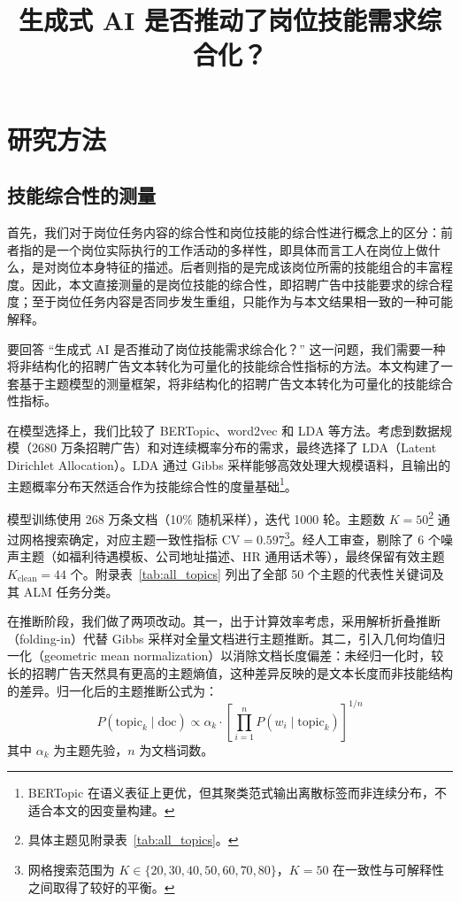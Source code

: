\documentclass[12pt, a4paper]{article}
\title{生成式 AI 是否推动了岗位技能需求综合化？}
\author{}
\date{}
\begin{document}
\maketitle

\section{研究方法}

\subsection{技能综合性的测量}

首先，我们对于岗位任务内容的综合性和岗位技能的综合性进行概念上的区分：前者指的是一个岗位实际执行的工作活动的多样性，即具体而言工人在岗位上做什么，是对岗位本身特征的描述。后者则指的是完成该岗位所需的技能组合的丰富程度。因此，本文直接测量的是岗位技能的综合性，即招聘广告中技能要求的综合程度；至于岗位任务内容是否同步发生重组，只能作为与本文结果相一致的一种可能解释。

要回答 “生成式 AI 是否推动了岗位技能需求综合化？” 这一问题，我们需要一种将非结构化的招聘广告文本转化为可量化的技能综合性指标的方法。本文构建了一套基于主题模型的测量框架，将非结构化的招聘广告文本转化为可量化的技能综合性指标。

在模型选择上，我们比较了 BERTopic、word2vec 和 LDA 等方法。考虑到数据规模（2680 万条招聘广告）和对连续概率分布的需求，最终选择了 LDA（Latent Dirichlet Allocation）。LDA 通过 Gibbs 采样能够高效处理大规模语料，且输出的主题概率分布天然适合作为技能综合性的度量基础\footnote{BERTopic 在语义表征上更优，但其聚类范式输出离散标签而非连续分布，不适合本文的因变量构建。}。

模型训练使用 268 万条文档（10\% 随机采样），迭代 1000 轮。主题数 $K=50$\footnote{具体主题见附录表~\ref{tab:all_topics}。} 通过网格搜索确定，对应主题一致性指标 $\text{CV}=0.597$\footnote{网格搜索范围为 $K \in \{20, 30, 40, 50, 60, 70, 80\}$，$K=50$ 在一致性与可解释性之间取得了较好的平衡。}。经人工审查，剔除了 6 个噪声主题（如福利待遇模板、公司地址描述、HR 通用话术等），最终保留有效主题 $K_{\text{clean}}=44$ 个。附录表~\ref{tab:all_topics} 列出了全部 50 个主题的代表性关键词及其 ALM 任务分类。

在推断阶段，我们做了两项改动。其一，出于计算效率考虑，采用解析折叠推断（folding-in）代替 Gibbs 采样对全量文档进行主题推断。其二，引入几何均值归一化（geometric mean normalization）以消除文档长度偏差：未经归一化时，较长的招聘广告天然具有更高的主题熵值，这种差异反映的是文本长度而非技能结构的差异。归一化后的主题推断公式为：
\begin{equation}
  P(\text{topic}_k \mid \text{doc}) \propto \alpha_k \cdot \left[\prod_{i=1}^{n} P(w_i \mid \text{topic}_k)\right]^{1/n}
\end{equation}
其中 $\alpha_k$ 为主题先验，$n$ 为文档词数。
\end{document}
